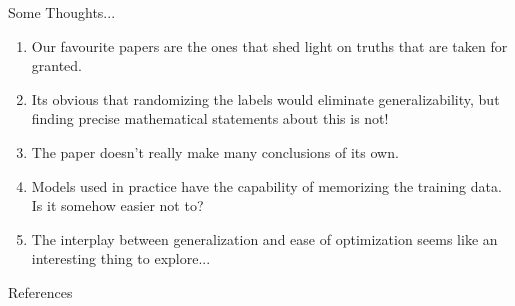 \documentclass[10pt]{beamer}
\begin{document}
\begin{frame}{Some Thoughts... }
	\begin{enumerate}
		\item Our favourite papers are the ones that shed light on truths that are taken for granted.
		\item Its obvious that randomizing the labels would eliminate generalizability, but finding precise mathematical statements about this is not!
		\item The paper doesn't really make many conclusions of its own.
		\item Models used in practice have the capability of memorizing the training data. Is it somehow easier not to?
		\item The interplay between generalization and ease of optimization seems like an interesting thing to explore...
	\end{enumerate}

	
	
	
	
\end{frame}	

\begin{frame}{References}


\end{frame}	
	
\end{document}
